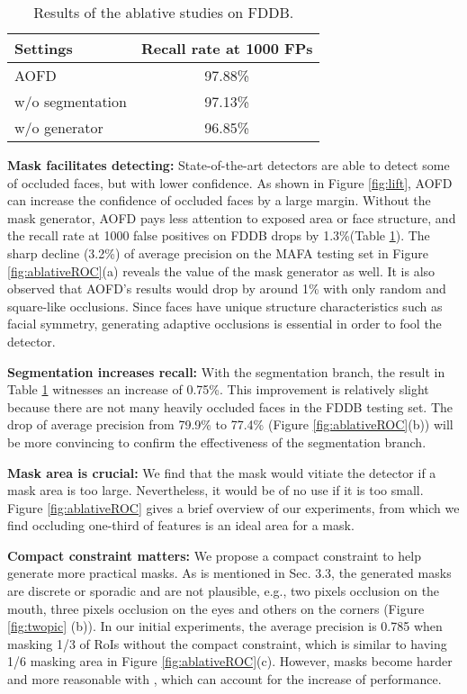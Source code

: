 \documentclass[10pt,twocolumn,letterpaper]{article}
\begin{document}
\begin{table}
	\renewcommand{\arraystretch}{1.5}
	 \begin{center}
	\begin{tabular}{|l|c|}
		\hline
		Settings & \multicolumn{1}{l|}{Recall rate at 1000 FPs} \\
		\hline\hline
		AOFD & 97.88\% \\
w/o segmentation & 97.13\% \\
w/o generator & 96.85\% \\
\hline
	\end{tabular}
	 \end{center}
        \caption{Results of the ablative studies on FDDB.}
	\label{tab:ablation}
\end{table}




\textbf{Mask facilitates detecting:} State-of-the-art detectors are able to detect some of occluded faces, but with lower confidence. As shown in Figure \ref{fig:lift}, AOFD can increase the confidence of occluded faces by a large margin. Without the mask generator, AOFD pays less attention to exposed area or face structure, and the recall rate at 1000 false positives on FDDB drops by 1.3\%(Table \ref{tab:ablation}). The sharp decline (3.2\%) of average precision on the MAFA testing set in Figure \ref{fig:ablativeROC}(a) reveals the value of the mask generator as well.
It is also observed that AOFD's results would drop by around 1\% with only random and square-like occlusions. Since faces have unique structure characteristics such as facial symmetry, generating adaptive occlusions is essential in order to fool the detector.


\textbf{Segmentation increases recall:} With the segmentation branch, the result in Table \ref{tab:ablation} witnesses an increase of 0.75\%. This improvement is relatively slight because there are not many heavily occluded faces in the FDDB testing set.
The drop of average precision from 79.9\% to 77.4\% (Figure \ref{fig:ablativeROC}(b)) will be more convincing to confirm the effectiveness of the segmentation branch. 


\textbf{Mask area is crucial:} We find that the mask would vitiate the detector if a mask area is too large. Nevertheless, it would be of no use if it is too small. Figure \ref{fig:ablativeROC} gives a brief overview of our experiments, from which we find occluding one-third of features is an ideal area for a mask. 


\textbf{Compact constraint matters:} We propose a compact constraint  to help generate more practical masks.
As is mentioned in Sec. 3.3, the generated masks are discrete or sporadic and are not plausible, e.g., two pixels occlusion on the mouth, three pixels occlusion on the eyes and others on the corners (Figure \ref{fig:twopic} (b)). In our initial experiments, the average precision is 0.785 when masking 1/3 of RoIs without the compact constraint, which is similar to having 1/6 masking area in Figure \ref{fig:ablativeROC}(c). However, masks become harder and more reasonable with , which can account for the increase of performance. 
\end{document}
